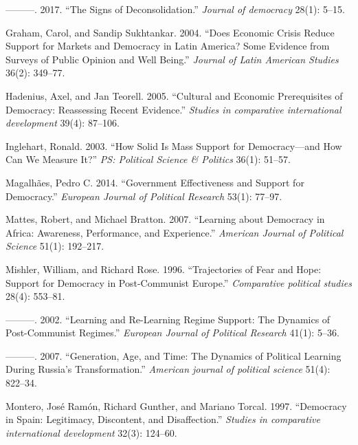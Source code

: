\documentclass[12pt,english,a4paper,oneside]{article}
\newlength{\cslhangindent}
\newlength{\cslentryspacingunit} %
\newenvironment{CSLReferences}[2] %
 {%
  \setlength{\parindent}{0pt}
  \ifodd #1
  \let\oldpar\par
  \def\par{\hangindent=\cslhangindent\oldpar}
  \fi
  \setlength{\parskip}{#2\cslentryspacingunit}
 }%
 {}
\theoremstyle{definition}
\theoremstyle{definition}
\theoremstyle{definition}
\theoremstyle{definition}
\theoremstyle{remark}
\begin{document}
\begin{CSLReferences}{1}{0}
\leavevmode{}%
---------. 2017. {``The Signs of Deconsolidation.''} \emph{Journal of democracy} 28(1): 5--15.

\leavevmode{}%
Graham, Carol, and Sandip Sukhtankar. 2004. {``Does Economic Crisis Reduce Support for Markets and Democracy in Latin America? Some Evidence from Surveys of Public Opinion and Well Being.''} \emph{Journal of Latin American Studies} 36(2): 349--77.

\leavevmode{}%
Hadenius, Axel, and Jan Teorell. 2005. {``Cultural and Economic Prerequisites of Democracy: Reassessing Recent Evidence.''} \emph{Studies in comparative international development} 39(4): 87--106.

\leavevmode{}%
Inglehart, Ronald. 2003. {``How Solid Is Mass Support for Democracy---and How Can We Measure It?''} \emph{PS: Political Science \& Politics} 36(1): 51--57.

\leavevmode{}%
Magalhães, Pedro C. 2014. {``Government Effectiveness and Support for Democracy.''} \emph{European Journal of Political Research} 53(1): 77--97.

\leavevmode{}%
Mattes, Robert, and Michael Bratton. 2007. {``Learning about Democracy in Africa: Awareness, Performance, and Experience.''} \emph{American Journal of Political Science} 51(1): 192--217.

\leavevmode{}%
Mishler, William, and Richard Rose. 1996. {``Trajectories of Fear and Hope: Support for Democracy in Post-Communist Europe.''} \emph{Comparative political studies} 28(4): 553--81.

\leavevmode{}%
---------. 2002. {``Learning and Re-Learning Regime Support: The Dynamics of Post-Communist Regimes.''} \emph{European Journal of Political Research} 41(1): 5--36.

\leavevmode{}%
---------. 2007. {``Generation, Age, and Time: The Dynamics of Political Learning During Russia's Transformation.''} \emph{American journal of political science} 51(4): 822--34.

\leavevmode{}%
Montero, José Ramón, Richard Gunther, and Mariano Torcal. 1997. {``Democracy in Spain: Legitimacy, Discontent, and Disaffection.''} \emph{Studies in comparative international development} 32(3): 124--60.


\end{CSLReferences}
\end{document}

